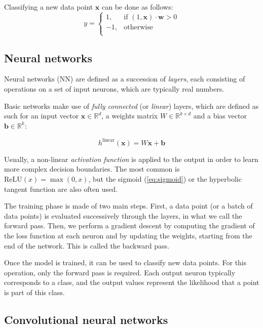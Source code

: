 \documentclass[a4paper,11pt,oneside]{report}
\begin{document}
Classifying a new data point $\mathbf{x}$ can be done as follows:
\begin{equation}\label{eq:logistic_reg_pred}
    y = 
    \begin{cases}
        1, & \text{if } (1, \mathbf{x}) \cdot \mathbf{w} > 0 \\
        -1, & \text{otherwise} \\
    \end{cases}
\end{equation}


\subsection{Neural networks}

Neural networks (NN) are defined as a succession of \emph{layers}, each consisting of operations on a set of input neurons, which are typically real numbers.

Basic networks make use of \emph{fully connected} (or \emph{linear}) layers, which are defined as such for an input vector $\mathbf{x} \in \mathbb{R}^d$, a weights matrix $W \in \mathbb{R}^{k \times d}$ and a bias vector $\mathbf{b} \in \mathbb{R}^k$:

\begin{equation}\label{eq:linear_layer}
    h^{\mathrm{linear}}(\mathbf{x}) = W \mathbf{x} + \mathbf{b}
\end{equation}

Usually, a non-linear \emph{activation function} is applied to the output in order to learn more complex decision boundaries. 
The most common is $\mathrm{ReLU}(x) = \max(0, x)$, but the sigmoid (\autoref{eq:sigmoid}) or the hyperbolic tangent function are also often used.

The training phase is made of two main steps. 
First, a data point (or a batch of data points) is evaluated successively through the layers, in what we call the forward pass. 
Then, we perform a gradient descent by computing the gradient of the loss function at each neuron and by updating the weights, starting from the end of the network. 
This is called the backward pass.

Once the model is trained, it can be used to classify new data points. 
For this operation, only the forward pass is required.
Each output neuron typically corresponds to a class, and the output values represent the likelihood that a point is part of this class.


\subsection{Convolutional neural networks}
\end{document}
